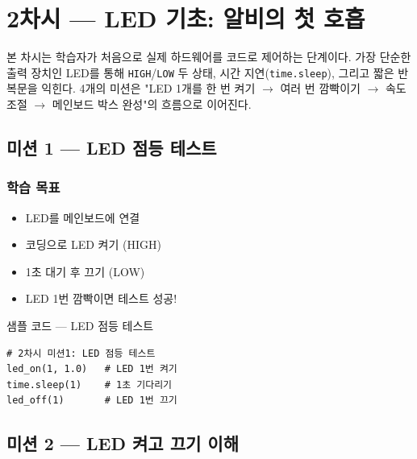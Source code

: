 \section{2차시 --- LED 기초: 알비의 첫 호흡}
\label{sec:ch02}

본 차시는 학습자가 처음으로 실제 하드웨어를 코드로 제어하는 단계이다.
가장 단순한 출력 장치인 LED를 통해 \texttt{HIGH}/\texttt{LOW} 두 상태,
시간 지연(\texttt{time.sleep}), 그리고 짧은 반복문을 익힌다. 4개의 미션은
"LED 1개를 한 번 켜기 $\to$ 여러 번 깜빡이기 $\to$ 속도 조절 $\to$ 메인보드
박스 완성"의 흐름으로 이어진다.

\subsection{미션 1 --- LED 점등 테스트}
\label{subsec:ch02-m1}

\begin{storybox}
\end{storybox}

\subsubsection*{학습 목표}
\begin{itemize}[leftmargin=1.4em]
  \item LED를 메인보드에 연결
  \item 코딩으로 LED 켜기 (HIGH)
  \item 1초 대기 후 끄기 (LOW)
  \item LED 1번 깜빡이면 테스트 성공!
\end{itemize}

\begin{labbox}{샘플 코드 --- LED 점등 테스트}
\begin{verbatim}
# 2차시 미션1: LED 점등 테스트
led_on(1, 1.0)   # LED 1번 켜기
time.sleep(1)    # 1초 기다리기
led_off(1)       # LED 1번 끄기
\end{verbatim}
\end{labbox}

\subsection{미션 2 --- LED 켜고 끄기 이해}
\label{subsec:ch02-m2}

